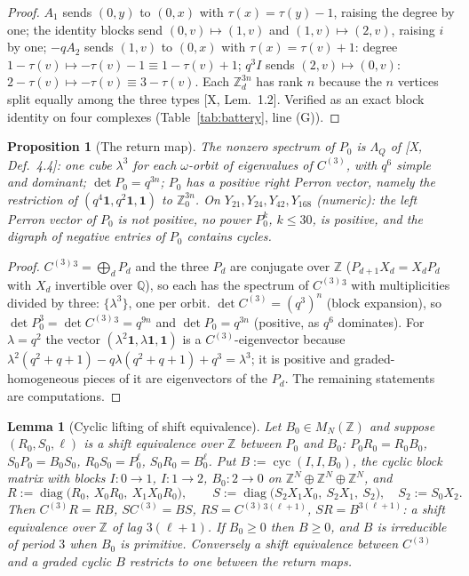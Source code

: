 \documentclass[11pt]{amsart}
\numberwithin{equation}{section}
\newtheorem{proposition}[theorem]{Proposition}
\newtheorem{lemma}[theorem]{Lemma}
\theoremstyle{definition}
\theoremstyle{remark}
\newcommand{\Z}{\mathbb{Z}}
\newcommand{\Q}{\mathbb{Q}}
\newcommand{\Cthree}{C^{(3)}}
\begin{document}
\begin{proof}
$A_1$ sends $(0,y)$ to $(0,x)$ with $\tau(x)=\tau(y)-1$, raising the degree by one; the
identity blocks send $(0,v)\mapsto(1,v)$ and $(1,v)\mapsto(2,v)$, raising $i$ by one;
$-qA_2$ sends $(1,v)$ to $(0,x)$ with $\tau(x)=\tau(v)+1$: degree $1-\tau(v)\mapsto
-\tau(v)-1\equiv1-\tau(v)+1$; $q^{3}I$ sends $(2,v)\mapsto(0,v)$: $2-\tau(v)\mapsto-\tau(v)
\equiv3-\tau(v)$. Each $\Z^{3n}_d$ has rank $n$ because the $n$ vertices split equally
among the three types [X, Lem.~1.2]. Verified as an exact block identity on four complexes
(Table~\ref{tab:battery}, line (G)).
\end{proof}

\begin{proposition}[The return map]\label{prop:P0}
The nonzero spectrum of $P_0$ is $\Lambda_Q$ of {\rm[X, Def.~4.4]}: one cube $\lambda^{3}$
for each $\omega$-orbit of eigenvalues of $\Cthree$, with $q^{6}$ simple and dominant;
$\det P_0=q^{3n}$; $P_0$ has a positive right Perron vector, namely the restriction of
$(q^{4}\mathbf1,q^{2}\mathbf1,\mathbf1)$ to $\Z^{3n}_0$. On $Y_{21},Y_{24},Y_{42},Y_{168}$
(numeric): the left Perron vector of $P_0$ is not positive, no power $P_0^{k}$, $k\le30$, is
positive, and the digraph of negative entries of $P_0$ contains cycles.
\end{proposition}

\begin{proof}
$\Cthree{}^{3}=\bigoplus_dP_d$ and the three $P_d$ are conjugate over $\Z$ ($P_{d+1}X_d=X_dP_d$
with $X_d$ invertible over $\Q$), so each has the spectrum of $\Cthree{}^{3}$ with
multiplicities divided by three: $\{\lambda^{3}\}$, one per orbit. $\det\Cthree=(q^{3})^{n}$
(block expansion), so $\det P_0^{3}=\det\Cthree{}^{3}=q^{9n}$ and $\det P_0=q^{3n}$
(positive, as $q^{6}$ dominates). For $\lambda=q^{2}$ the vector $(\lambda^{2}\mathbf1,\lambda
\mathbf1,\mathbf1)$ is a $\Cthree$-eigenvector because $\lambda^{2}(q^{2}+q+1)-q\lambda(q^{2}
+q+1)+q^{3}=\lambda^{3}$; it is positive and graded-homogeneous pieces of it are
eigenvectors of the $P_d$. The remaining statements are computations.
\end{proof}

\begin{lemma}[Cyclic lifting of shift equivalence]\label{lem:lift}
Let $B_0\in M_N(\Z)$ and suppose $(R_0,S_0,\ell)$ is a shift equivalence over $\Z$ between
$P_0$ and $B_0$: $P_0R_0=R_0B_0$, $S_0P_0=B_0S_0$, $R_0S_0=P_0^{\ell}$, $S_0R_0=B_0^{\ell}$.
Put $B:=\operatorname{cyc}(I,I,B_0)$, the cyclic block matrix with blocks $I\colon0\to1$,
$I\colon1\to2$, $B_0\colon2\to0$ on $\Z^{N}\oplus\Z^{N}\oplus\Z^{N}$, and
\[
R:=\operatorname{diag}\bigl(R_0,\ X_0R_0,\ X_1X_0R_0\bigr),\qquad
S:=\operatorname{diag}\bigl(S_2X_1X_0,\ S_2X_1,\ S_2\bigr),\quad S_2:=S_0X_2 .
\]
Then $\Cthree R=RB$, $S\Cthree=BS$, $RS=\Cthree{}^{3(\ell+1)}$, $SR=B^{3(\ell+1)}$: a shift
equivalence over $\Z$ of lag $3(\ell+1)$. If $B_0\ge0$ then $B\ge0$, and $B$ is irreducible
of period $3$ when $B_0$ is primitive. Conversely a shift equivalence between $\Cthree$ and
a graded cyclic $B$ restricts to one between the return maps.
\end{lemma}
\end{document}
